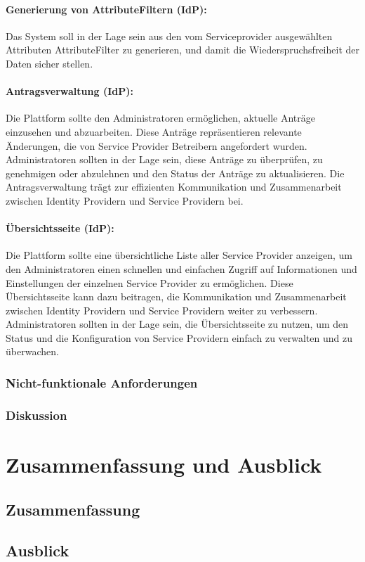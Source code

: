\documentclass[a4paper, fontsize=11pt]{scrartcl}
\begin{document}
\paragraph{Generierung von AttributeFiltern (IdP):}
Das System soll in der Lage sein aus den vom Serviceprovider ausgewählten Attributen AttributeFilter zu generieren, und damit die Wiederspruchsfreiheit der Daten sicher stellen.

\paragraph{Antragsverwaltung (IdP):}
Die Plattform sollte den Administratoren ermöglichen, aktuelle Anträge einzusehen und abzuarbeiten. Diese Anträge repräsentieren relevante Änderungen, die von Service Provider Betreibern angefordert wurden.
Administratoren sollten in der Lage sein, diese Anträge zu überprüfen, zu genehmigen oder abzulehnen und den Status der Anträge zu aktualisieren.
Die Antragsverwaltung trägt zur effizienten Kommunikation und Zusammenarbeit zwischen Identity Providern und Service Providern bei.

\paragraph{Übersichtsseite (IdP):}
Die Plattform sollte eine übersichtliche Liste aller Service Provider anzeigen, um den Administratoren einen schnellen und einfachen Zugriff auf Informationen und Einstellungen der einzelnen Service Provider zu ermöglichen.
Diese Übersichtsseite kann dazu beitragen, die Kommunikation und Zusammenarbeit zwischen Identity Providern und Service Providern weiter zu verbessern. 
Administratoren sollten in der Lage sein, die Übersichtsseite zu nutzen, um den Status und die Konfiguration von Service Providern einfach zu verwalten und zu überwachen.
\subsubsection{Nicht-funktionale Anforderungen}\label{subsubsec:non-functional-requirements}
\subsubsection{Diskussion}\label{subsubsec:anforderungsanalyse-discussion}

\section{Zusammenfassung und Ausblick}\label{sec:summary}
\subsection{Zusammenfassung}\label{subsec:summary}
\subsection{Ausblick}\label{subsec:outlook}

\newpage

\printbibliography{}
\listoffigures
\end{document}
